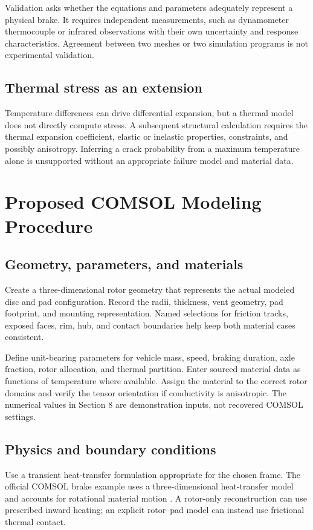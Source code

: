 \documentclass[11pt,a4paper]{article}
\newcommand{\sectionpage}[1]{\clearpage\section{#1}}
\begin{document}
Validation asks whether the equations and parameters adequately represent a physical brake. It requires independent measurements, such as dynamometer thermocouple or infrared observations with their own uncertainty and response characteristics. Agreement between two meshes or two simulation programs is not experimental validation.

\subsection{Thermal stress as an extension}
Temperature differences can drive differential expansion, but a thermal model does not directly compute stress. A subsequent structural calculation requires the thermal expansion coefficient, elastic or inelastic properties, constraints, and possibly anisotropy. Inferring a crack probability from a maximum temperature alone is unsupported without an appropriate failure model and material data.

\sectionpage{Proposed COMSOL Modeling Procedure}
\subsection{Geometry, parameters, and materials}
Create a three-dimensional rotor geometry that represents the actual modeled disc and pad configuration. Record the radii, thickness, vent geometry, pad footprint, and mounting representation. Named selections for friction tracks, exposed faces, rim, hub, and contact boundaries help keep both material cases consistent.

Define unit-bearing parameters for vehicle mass, speed, braking duration, axle fraction, rotor allocation, and thermal partition. Enter sourced material data as functions of temperature where available. Assign the material to the correct rotor domains and verify the tensor orientation if conductivity is anisotropic. The numerical values in Section 8 are demonstration inputs, not recovered COMSOL settings.

\subsection{Physics and boundary conditions}
Use a transient heat-transfer formulation appropriate for the chosen frame. The official COMSOL brake example uses a three-dimensional heat-transfer model and accounts for rotational material motion \cite{comsol}. A rotor-only reconstruction can use prescribed inward heating; an explicit rotor--pad model can instead use frictional thermal contact.
\end{document}
